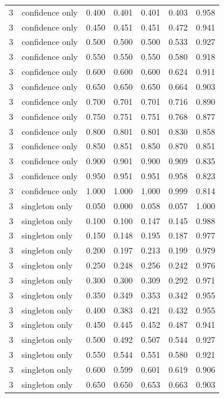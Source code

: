 \begin{tabular}{rlrrrrr}
3 & confidence only & 0.400 & 0.401 & 0.401 & 0.403 & 0.958 \\
3 & confidence only & 0.450 & 0.451 & 0.451 & 0.472 & 0.941 \\
3 & confidence only & 0.500 & 0.500 & 0.500 & 0.533 & 0.927 \\
3 & confidence only & 0.550 & 0.550 & 0.550 & 0.580 & 0.918 \\
3 & confidence only & 0.600 & 0.600 & 0.600 & 0.624 & 0.911 \\
3 & confidence only & 0.650 & 0.650 & 0.650 & 0.664 & 0.903 \\
3 & confidence only & 0.700 & 0.701 & 0.701 & 0.716 & 0.890 \\
3 & confidence only & 0.750 & 0.751 & 0.751 & 0.768 & 0.877 \\
3 & confidence only & 0.800 & 0.801 & 0.801 & 0.830 & 0.858 \\
3 & confidence only & 0.850 & 0.851 & 0.850 & 0.870 & 0.851 \\
3 & confidence only & 0.900 & 0.901 & 0.900 & 0.909 & 0.835 \\
3 & confidence only & 0.950 & 0.951 & 0.951 & 0.958 & 0.823 \\
3 & confidence only & 1.000 & 1.000 & 1.000 & 0.999 & 0.814 \\
3 & singleton only & 0.050 & 0.000 & 0.058 & 0.057 & 1.000 \\
3 & singleton only & 0.100 & 0.100 & 0.147 & 0.145 & 0.988 \\
3 & singleton only & 0.150 & 0.148 & 0.195 & 0.187 & 0.977 \\
3 & singleton only & 0.200 & 0.197 & 0.213 & 0.199 & 0.979 \\
3 & singleton only & 0.250 & 0.248 & 0.256 & 0.242 & 0.976 \\
3 & singleton only & 0.300 & 0.300 & 0.309 & 0.292 & 0.971 \\
3 & singleton only & 0.350 & 0.349 & 0.353 & 0.342 & 0.955 \\
3 & singleton only & 0.400 & 0.383 & 0.421 & 0.432 & 0.955 \\
3 & singleton only & 0.450 & 0.445 & 0.452 & 0.487 & 0.941 \\
3 & singleton only & 0.500 & 0.492 & 0.507 & 0.544 & 0.927 \\
3 & singleton only & 0.550 & 0.544 & 0.551 & 0.580 & 0.921 \\
3 & singleton only & 0.600 & 0.599 & 0.601 & 0.619 & 0.906 \\
3 & singleton only & 0.650 & 0.650 & 0.653 & 0.663 & 0.903 \\

\end{tabular}
